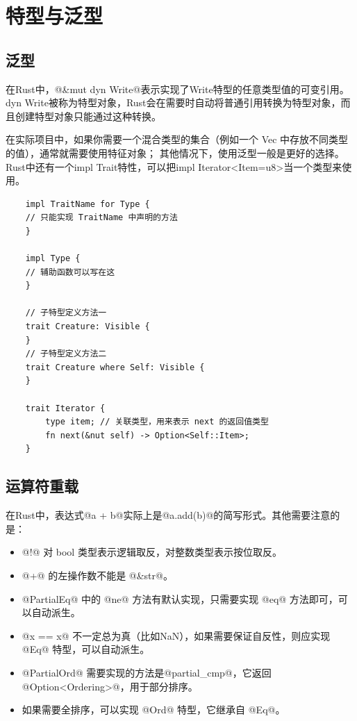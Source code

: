 \section{特型与泛型}
\subsection{泛型}
在Rust中，@&mut dyn Write@表示实现了Write特型的任意类型值的可变引用。
dyn Write被称为特型对象，Rust会在需要时自动将普通引用转换为特型对象，而且创建特型对象只能通过这种转换。

在实际项目中，如果你需要一个混合类型的集合（例如一个 Vec 中存放不同类型的值），通常就需要使用特征对象；
其他情况下，使用泛型一般是更好的选择。
Rust中还有一个impl Trait特性，可以把impl Iterator<Item=u8>当一个类型来使用。

\begin{code}[title=特型实现]
	\begin{verbatim}
    impl TraitName for Type { 
    // 只能实现 TraitName 中声明的方法
    }
    
    impl Type { 
    // 辅助函数可以写在这
    }

    // 子特型定义方法一
    trait Creature: Visible {
    }
    // 子特型定义方法二
    trait Creature where Self: Visible { 
    }

    trait Iterator {
        type item; // 关联类型，用来表示 next 的返回值类型
        fn next(&nut self) -> Option<Self::Item>;
    }
    \end{verbatim}
\end{code}

\subsection{运算符重载}
在Rust中，表达式@a + b@实际上是@a.add(b)@的简写形式。其他需要注意的是：
\begin{itemize}[itemsep=0pt, parsep=0pt]
	\item @!@ 对 bool 类型表示逻辑取反，对整数类型表示按位取反。
	\item @+@ 的左操作数不能是 @&str@。
	\item @PartialEq@ 中的 @ne@ 方法有默认实现，只需要实现 @eq@ 方法即可，可以自动派生。
	\item @x == x@ 不一定总为真（比如NaN），如果需要保证自反性，则应实现 @Eq@ 特型，可以自动派生。
	\item @PartialOrd@ 需要实现的方法是@partial_cmp@，它返回@Option<Ordering>@，用于部分排序。
	\item 如果需要全排序，可以实现 @Ord@ 特型，它继承自 @Eq@。
\end{itemize}

